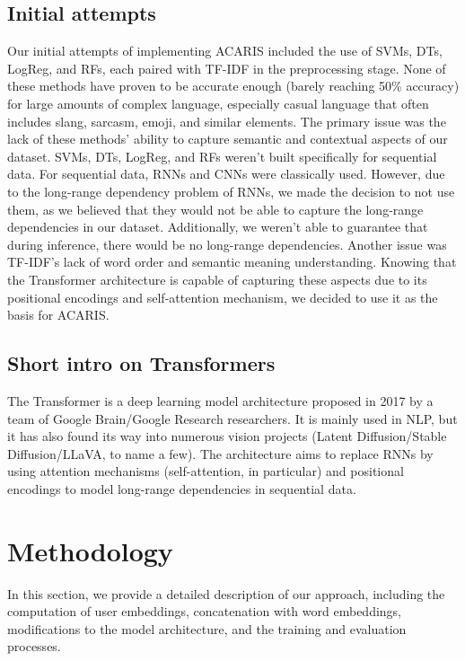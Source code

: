 \documentclass{article}
\begin{document}
\subsection{Initial attempts}
Our initial attempts of implementing ACARIS included the use of SVMs, DTs, LogReg, and RFs, each paired with TF-IDF in the preprocessing stage. None of these methods have proven to be accurate enough (barely reaching 50\% accuracy) for large amounts of complex language, especially casual language that often includes slang, sarcasm, emoji, and similar elements. The primary issue was the lack of these methods' ability to capture semantic and contextual aspects of our dataset. SVMs, DTs, LogReg, and RFs weren't built specifically for sequential data. For sequential data, RNNs and CNNs were classically used. However, due to the long-range dependency problem of RNNs, we made the decision to not use them, as we believed that they would not be able to capture the long-range dependencies in our dataset. Additionally, we weren't able to guarantee that during inference, there would be no long-range dependencies.
Another issue was TF-IDF's lack of word order and semantic meaning understanding. Knowing that the Transformer\cite{vaswani2017attention} architecture is capable of capturing these aspects due to its positional encodings and self-attention mechanism, we decided to use it as the basis for ACARIS.

\subsection{Short intro on Transformers}
The Transformer is a deep learning model architecture proposed in 2017 by a team of Google Brain/Google Research researchers. It is mainly used in NLP, but it has also found its way into numerous vision projects (Latent Diffusion\cite{rombach2021highresolution}/Stable Diffusion/LLaVA\cite{liu2023visual}, to name a few). The architecture aims to replace RNNs by using attention mechanisms (self-attention, in particular) and positional encodings to model long-range dependencies in sequential data.

\section{Methodology}
In this section, we provide a detailed description of our approach, including the computation of user embeddings, concatenation with word embeddings, modifications to the model architecture, and the training and evaluation processes.
\end{document}
